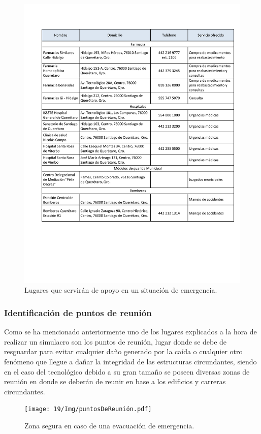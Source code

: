 \begin{figure}[H]
    \centering
    \includegraphics[trim = {15mm 60mm 5mm 25mm},clip,scale=0.4]{19/Img/apoyosExt.pdf}
    \caption{ Lugares que servirán de apoyo en un situación de emergencia.}
    \label{fig:apoyosExt}
\end{figure}
\subsubsection{Identificación de puntos de reunión}
Como se ha mencionado anteriormente uno de los lugares explicados a la hora de realizar un simulacro son los puntos de reunión, lugar donde se debe de resguardar para evitar cualquier daño generado por la caída o cualquier otro fenómeno que llegue a dañar la integridad de las estructuras circundantes, siendo en el caso del tecnológico debido a su gran tamaño se poseen diversas zonas de reunión en donde se deberán de reunir en base a los edificios y carreras circundantes.
\begin{figure}[H]
    \centering
    \texttt{[image: 19/Img/puntosDeReunión.pdf]}
    \caption{Zona segura en caso de una evacuación de emergencia.}
    \label{fig:puntosDeReunión}
\end{figure}

